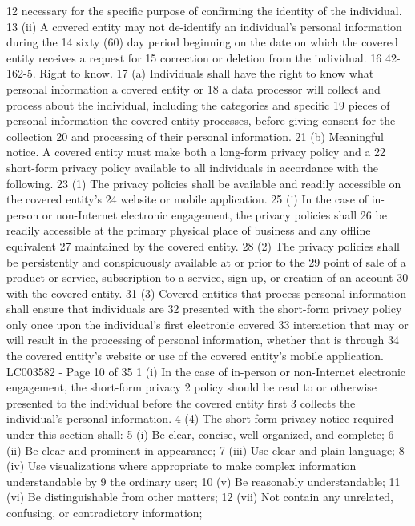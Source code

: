 12 necessary for the specific purpose of confirming the identity of the individual.
13 (ii) A covered entity may not de-identify an individual's personal information during the
14 sixty (60) day period beginning on the date on which the covered entity receives a request for
15 correction or deletion from the individual.
16 42-162-5. Right to know.
17 (a) Individuals shall have the right to know what personal information a covered entity or
18 a data processor will collect and process about the individual, including the categories and specific
19 pieces of personal information the covered entity processes, before giving consent for the collection
20 and processing of their personal information.
21 (b) Meaningful notice. A covered entity must make both a long-form privacy policy and a
22 short-form privacy policy available to all individuals in accordance with the following.
23 (1) The privacy policies shall be available and readily accessible on the covered entity's
24 website or mobile application.
25 (i) In the case of in-person or non-Internet electronic engagement, the privacy policies shall
26 be readily accessible at the primary physical place of business and any offline equivalent
27 maintained by the covered entity.
28 (2) The privacy policies shall be persistently and conspicuously available at or prior to the
29 point of sale of a product or service, subscription to a service, sign up, or creation of an account
30 with the covered entity.
31 (3) Covered entities that process personal information shall ensure that individuals are
32 presented with the short-form privacy policy only once upon the individual's first electronic covered
33 interaction that may or will result in the processing of personal information, whether that is through
34 the covered entity's website or use of the covered entity's mobile application.
LC003582 - Page 10 of 35
1 (i) In the case of in-person or non-Internet electronic engagement, the short-form privacy
2 policy should be read to or otherwise presented to the individual before the covered entity first
3 collects the individual's personal information.
4 (4) The short-form privacy notice required under this section shall:
5 (i) Be clear, concise, well-organized, and complete;
6 (ii) Be clear and prominent in appearance;
7 (iii) Use clear and plain language;
8 (iv) Use visualizations where appropriate to make complex information understandable by
9 the ordinary user;
10 (v) Be reasonably understandable;
11 (vi) Be distinguishable from other matters;
12 (vii) Not contain any unrelated, confusing, or contradictory information;
